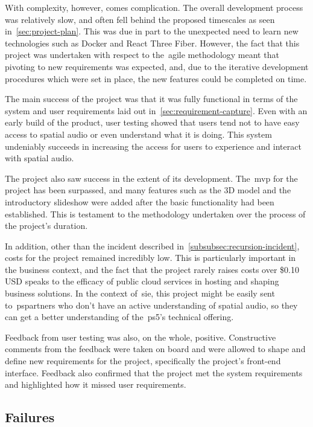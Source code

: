 With complexity, however, comes complication.
The overall development process was relatively slow,
and often fell behind the proposed timescales as seen in~\ref{sec:project-plan}.
This was due in part to the unexpected need to learn new technologies such as Docker and React Three Fiber.
However,
the fact that this project was undertaken with respect to the~\gls{agile} methodology meant
that pivoting to new requirements was expected, and,
due to the iterative development procedures which were set in place,
the new features could be completed on time.

The main success of the project was
that it was fully functional in terms of the system and user requirements laid out in~\ref{sec:requirement-capture}.
Even with an early build of the product,
user testing showed that users tend not to have easy access to spatial audio or even understand what it is doing.
This system undeniably succeeds in increasing the access for users to experience and interact with spatial audio.

The project also saw success in the extent of its development.
The~\gls{mvp} for the project has been surpassed,
and many features such as the 3D model and the introductory slideshow were added
after the basic functionality had been established.
This is testament to the methodology undertaken over the process of the project's duration.

In addition, other than the incident described in~\ref{subsubsec:recursion-incident},
costs for the project remained incredibly low.
This is particularly important in the business context,
and the fact that the project rarely raises costs over \$0.10 USD speaks to the efficacy of public cloud services
in hosting and shaping business solutions.
In the context of~\gls{sie},
this project might be easily sent
to~\glspl{pspartner} who don't have an active understanding of spatial audio,
so they can get a better understanding of the~\gls{ps5}'s technical offering.

Feedback from user testing was also, on the whole, positive.
Constructive comments from the feedback were taken on board
and were allowed to shape and define new requirements for the project, specifically the project's front-end interface.
Feedback also confirmed that the project met the system requirements and highlighted how it missed user requirements.

\subsection{Failures}\label{subsec:failures}


